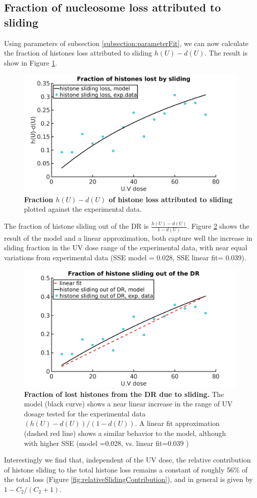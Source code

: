 \documentclass[12pt]{article}
\begin{document}
\subsection{Fraction of nucleosome loss attributed to sliding}\label{subsection:lossAttributedToSliding}
Using parameters of subsection \ref{subsection:parameterFit}, we can now calculate the fraction of histones loss attributed to sliding $h(U)-d(U)$. The result is show in Figure \ref{fig:hVsUVDoseModelFit01}.
\begin{figure}[http!]
\centering
\includegraphics[width=0.5\linewidth, height=0.3\textheight]{hVsUVDoseModelFit}
\caption{\textbf{Fraction $h(U)-d(U)$ of histone loss attributed to sliding} plotted against the experimental data.}
\label{fig:hVsUVDoseModelFit01}
\end{figure}
The fraction of histone sliding out of the DR is $\frac{h(U)-d(U)}{1-d(U)}$. Figure \ref{fig:histoneSlideFromDamageRegionComparision} shows the result of the model and a linear approximation, both capture well the increase in sliding fraction in the UV dose range of the experimental data, with near equal variations from experimental data (SSE model = 0.028, SSE linear fit= 0.039).
\begin{figure}[http!]
	\centering
	\includegraphics[width=0.7\linewidth, height=0.3\textheight]{histoneSlideFromDamageRegionComparision}
	\caption{\textbf{Fraction of lost histones from the DR due to sliding.} The model (black curve) shows a near linear increase in the range of UV dosage tested for the experimental data $(h(U)-d(U))/(1-d(U))$. A linear fit approximation (dashed red line) shows a similar behavior to the model, although with higher SSE (model =0.028, vs. linear fit=0.039 ) }
	\label{fig:histoneSlideFromDamageRegionComparision}
\end{figure}
Interestingly we find that, independent of the UV dose, the relative contribution of histone sliding to the total histone loss remains a constant of roughly 56\% of the total loss (Figure \ref{fig:relativeSlidingContribution}), and in general is given by $1-C_2/(C_2+1)$.
\end{document}
